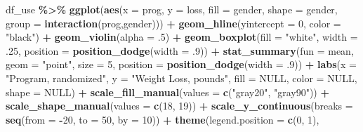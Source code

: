 \documentclass[
]{article}
\newenvironment{Shaded}{\begin{snugshade}}{\end{snugshade}}
\newcommand{\AttributeTok}[1]{\textcolor[rgb]{0.13,0.29,0.53}{#1}}
\newcommand{\ConstantTok}[1]{\textcolor[rgb]{0.56,0.35,0.01}{#1}}
\newcommand{\DecValTok}[1]{\textcolor[rgb]{0.00,0.00,0.81}{#1}}
\newcommand{\FunctionTok}[1]{\textcolor[rgb]{0.13,0.29,0.53}{\textbf{#1}}}
\newcommand{\NormalTok}[1]{#1}
\newcommand{\SpecialCharTok}[1]{\textcolor[rgb]{0.81,0.36,0.00}{\textbf{#1}}}
\newcommand{\StringTok}[1]{\textcolor[rgb]{0.31,0.60,0.02}{#1}}
\begin{document}
\begin{Shaded}
\begin{Highlighting}[]
\NormalTok{df\_use }\SpecialCharTok{\%\textgreater{}\%} 
  \FunctionTok{ggplot}\NormalTok{(}\FunctionTok{aes}\NormalTok{(}\AttributeTok{x =}\NormalTok{ prog,}
             \AttributeTok{y =}\NormalTok{ loss,}
             \AttributeTok{fill =}\NormalTok{ gender,}
             \AttributeTok{shape =}\NormalTok{ gender,}
             \AttributeTok{group =} \FunctionTok{interaction}\NormalTok{(prog,gender))) }\SpecialCharTok{+}
  \FunctionTok{geom\_hline}\NormalTok{(}\AttributeTok{yintercept =} \DecValTok{0}\NormalTok{, }\AttributeTok{color =} \StringTok{"black"}\NormalTok{) }\SpecialCharTok{+} 
  \FunctionTok{geom\_violin}\NormalTok{(}\AttributeTok{alpha =}\NormalTok{ .}\DecValTok{5}\NormalTok{) }\SpecialCharTok{+}
  \FunctionTok{geom\_boxplot}\NormalTok{(}\AttributeTok{fill =} \StringTok{"white"}\NormalTok{,}
               \AttributeTok{width =}\NormalTok{ .}\DecValTok{25}\NormalTok{,}
               \AttributeTok{position =} \FunctionTok{position\_dodge}\NormalTok{(}\AttributeTok{width =}\NormalTok{ .}\DecValTok{9}\NormalTok{)) }\SpecialCharTok{+}
  \FunctionTok{stat\_summary}\NormalTok{(}\AttributeTok{fun =}\NormalTok{ mean,}
               \AttributeTok{geom =} \StringTok{"point"}\NormalTok{,}
               \AttributeTok{size =} \DecValTok{5}\NormalTok{,}
               \AttributeTok{position =} \FunctionTok{position\_dodge}\NormalTok{(}\AttributeTok{width =}\NormalTok{ .}\DecValTok{9}\NormalTok{)) }\SpecialCharTok{+}
  \FunctionTok{labs}\NormalTok{(}\AttributeTok{x =} \StringTok{"Program, randomized"}\NormalTok{,}
       \AttributeTok{y =} \StringTok{"Weight Loss, pounds"}\NormalTok{,}
       \AttributeTok{fill =} \ConstantTok{NULL}\NormalTok{,}
       \AttributeTok{color =} \ConstantTok{NULL}\NormalTok{,}
       \AttributeTok{shape =} \ConstantTok{NULL}\NormalTok{)  }\SpecialCharTok{+}
  \FunctionTok{scale\_fill\_manual}\NormalTok{(}\AttributeTok{values =} \FunctionTok{c}\NormalTok{(}\StringTok{"gray20"}\NormalTok{, }\StringTok{"gray90"}\NormalTok{)) }\SpecialCharTok{+}
  \FunctionTok{scale\_shape\_manual}\NormalTok{(}\AttributeTok{values =} \FunctionTok{c}\NormalTok{(}\DecValTok{18}\NormalTok{, }\DecValTok{19}\NormalTok{)) }\SpecialCharTok{+}
  \FunctionTok{scale\_y\_continuous}\NormalTok{(}\AttributeTok{breaks =} \FunctionTok{seq}\NormalTok{(}\AttributeTok{from =} \SpecialCharTok{{-}}\DecValTok{20}\NormalTok{, }\AttributeTok{to =} \DecValTok{50}\NormalTok{, }\AttributeTok{by =} \DecValTok{10}\NormalTok{)) }\SpecialCharTok{+}
  \FunctionTok{theme}\NormalTok{(}\AttributeTok{legend.position =} \FunctionTok{c}\NormalTok{(}\DecValTok{0}\NormalTok{, }\DecValTok{1}\NormalTok{),}

\end{Highlighting}
\end{Shaded}
\end{document}
